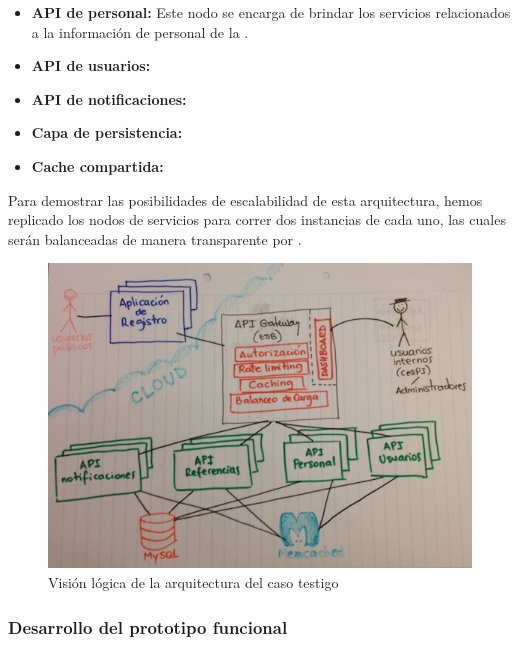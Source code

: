 \begin{itemize}
  \item \textbf{API de personal:} Este nodo se encarga de brindar los servicios relacionados a la información de personal de la \unlp.

  \item \textbf{API de usuarios:}

  \item \textbf{API de notificaciones:}

  \item \textbf{Capa de persistencia:}

  \item \textbf{Cache compartida:}
\end{itemize}

Para demostrar las posibilidades de escalabilidad de esta arquitectura, hemos replicado los nodos de servicios para correr dos instancias de cada uno, las cuales serán balanceadas de manera transparente por .

\begin{figure}
  \includegraphics[width=\linewidth]{src/images/05-capitulo-5/arquitectura-caso-testigo.jpg}
  \caption{Visión lógica de la arquitectura del caso testigo}
  \label{fig:arquitectura-caso-testigo}
\end{figure}

\subsubsection{Desarrollo del prototipo funcional}

